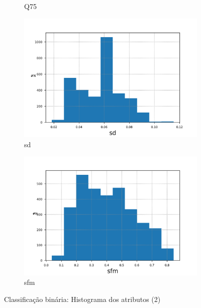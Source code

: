 \documentclass{article}
\begin{document}
\begin{figure}[H]
\begin{subfigure}{.5\textwidth}
                \caption{Q75}
            \end{subfigure}
            \begin{subfigure}{.5\textwidth}
                \centering
                \includegraphics[width=.8\linewidth]{img1/data_histsd.png}
                \caption{sd}
            \end{subfigure}
            \begin{subfigure}{.5\textwidth}
                \centering
                \includegraphics[width=.8\linewidth]{img1/data_histsfm.png}
                \caption{sfm}
            \end{subfigure}
        \caption{Classificação binária: Histograma dos atributos (2)}
        \label{fig:a_hist_2}
        \end{figure}
\end{document}
